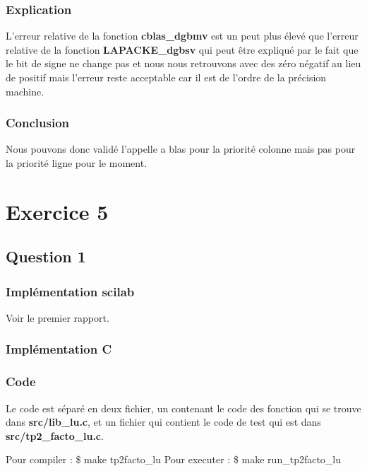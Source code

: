 \documentclass[11pt]{article}
\begin{document}
\subsubsection{Explication}

L'erreur relative de la fonction \textbf{cblas\_dgbmv} est un peut
plus élevé que l'erreur relative de la fonction
\textbf{LAPACKE\_dgbsv} qui peut être expliqué par le fait que le bit
de signe ne change pas et nous nous retrouvons avec des zéro négatif
au lieu de positif mais l'erreur reste acceptable car il est de
l'ordre de la précision machine.

\subsubsection{Conclusion}

Nous pouvons donc validé l'appelle a blas pour la priorité colonne
mais pas pour la priorité ligne pour le moment.

\section{Exercice 5}

\subsection{Question 1}

\subsubsection{Implémentation scilab}

Voir le premier rapport.

\subsubsection{Implémentation C}

\subsubsection{Code}

Le code est séparé en deux fichier, un contenant le code des fonction
qui se trouve dans \textbf{src/lib\_lu.c}, et un fichier qui contient
le code de test qui est dans \textbf{src/tp2\_facto\_lu.c}.\newline

Pour compiler : \$ make tp2facto\_lu\newline
Pour executer : \$ make run\_tp2facto\_lu\newline
\end{document}
